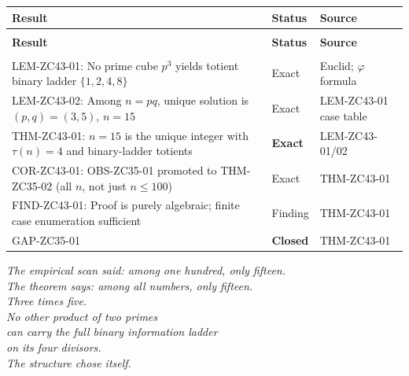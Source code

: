 \documentclass[12pt, a4paper]{article}
\providecommand{\phitot}{\varphi}
\begin{document}
{\small
\setlength{\LTpre}{4pt}\setlength{\LTpost}{4pt}
\renewcommand{\arraystretch}{1.30}
\begin{longtable}{>{\raggedright\arraybackslash}p{5.5cm}
                  >{\centering\arraybackslash}p{2.5cm}
                  >{\raggedright\arraybackslash}p{4.3cm}}
\toprule
\textbf{Result} & \textbf{Status} & \textbf{Source} \\
\midrule
\endfirsthead
\multicolumn{3}{l}{\small\textit{(continued)}}\\[4pt]
\toprule
\textbf{Result} & \textbf{Status} & \textbf{Source} \\
\midrule
\endhead
\midrule
\multicolumn{3}{r}{\small\textit{(continues)}}\\
\endfoot
\bottomrule
\endlastfoot

LEM-ZC43-01: No prime cube $p^3$ yields
  totient binary ladder $\{1,2,4,8\}$ &
  Exact & Euclid; $\phitot$ formula \\

LEM-ZC43-02: Among $n=pq$, unique solution
  is $(p,q)=(3,5)$, $n=15$ &
  Exact & LEM-ZC43-01 case table \\

THM-ZC43-01: $n=15$ is the unique integer
  with $\tau(n)=4$ and binary-ladder totients &
  \textbf{Exact} & LEM-ZC43-01/02 \\

COR-ZC43-01: OBS-ZC35-01 promoted to
  THM-ZC35-02 (all $n$, not just $n\leq 100$) &
  Exact & THM-ZC43-01 \\

FIND-ZC43-01: Proof is purely algebraic;
  finite case enumeration sufficient &
  Finding & THM-ZC43-01 \\

GAP-ZC35-01 &
  \textbf{Closed} & THM-ZC43-01 \\

\end{longtable}
}
\vspace{-\parskip}

\bigskip
\begin{center}
\textit{The empirical scan said: among one hundred, only fifteen.\\
The theorem says: among all numbers, only fifteen.\\[0.3em]
Three times five.\\
No other product of two primes\\
can carry the full binary information ladder\\
on its four divisors.\\[0.3em]
The structure chose itself.}
\end{center}
\end{document}
